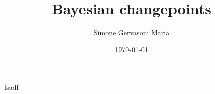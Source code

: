 \documentclass{article}
\title{Bayesian changepoints}
\author{Simone Gervasoni Maria}
\date{\today}
\begin{document}
\thispagestyle{empty}
\maketitle
\pagebreak
 
\thispagestyle{empty}
\tableofcontents
\clearpage


fsadf\cite{chib1998estimation}



\nocite{*} 
\end{document}

